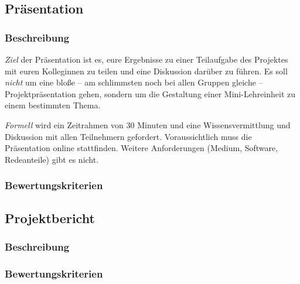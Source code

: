 \documentclass[DIV=15,headinclude]{scrartcl}
\begin{document}
\subsection{Präsentation}

\subsubsection{Beschreibung}

\emph{Ziel} der Präsentation ist es, eure Ergebnisse zu einer Teilaufgabe des Projektes mit euren Kolleginnen zu teilen und eine Diskussion darüber zu führen. Es soll \emph{nicht} um eine bloße – am schlimmsten noch bei allen Gruppen gleiche – Projektpräsentation gehen, sondern um die Gestaltung einer Mini-Lehreinheit zu einem bestimmten Thema.

\emph{Formell} wird ein Zeitrahmen von 30 Minuten und eine Wissensvermittlung und Diskussion mit allen Teilnehmern gefordert. Voraussichtlich muss die Präsentation online stattfinden. Weitere Anforderungen (Medium, Software, Redeanteile) gibt es nicht.

\subsubsection{Bewertungskriterien}


\subsection{Projektbericht}

\subsubsection{Beschreibung}


\subsubsection{Bewertungskriterien}



\end{document}
